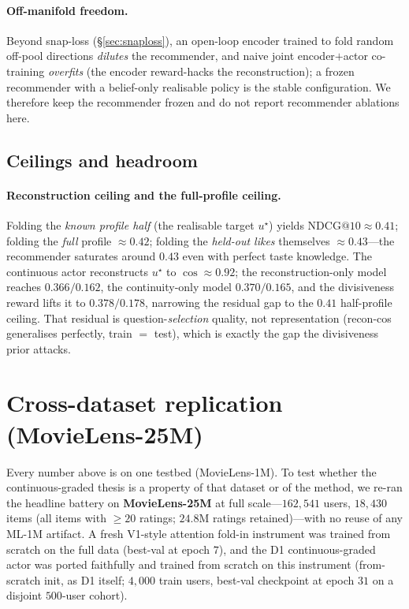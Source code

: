 \documentclass[11pt]{article}
\newcommand{\ustar}{u^{\star}}
\begin{document}
\paragraph{Off-manifold freedom.} Beyond snap-loss (\S\ref{sec:snaploss}), an open-loop encoder trained to fold random
off-pool directions \emph{dilutes} the recommender, and naive joint encoder$+$actor co-training \emph{overfits} (the
encoder reward-hacks the reconstruction); a frozen recommender with a belief-only realisable policy is the stable
configuration. We therefore keep the recommender frozen and do not report recommender ablations here.

\subsection{Ceilings and headroom}\label{sec:ceiling}
\paragraph{Reconstruction ceiling and the full-profile ceiling.} Folding the \emph{known profile half} (the realisable
target $\ustar$) yields $\mathrm{NDCG@10}\approx0.41$; folding the \emph{full} profile $\approx0.42$; folding the
\emph{held-out likes} themselves $\approx0.43$---the recommender saturates around $0.43$ even with perfect taste
knowledge. The continuous actor reconstructs $\ustar$ to $\cos\approx0.92$; the reconstruction-only model reaches
$0.366/0.162$, the continuity-only model $0.370/0.165$, and the divisiveness reward lifts it to $0.378/0.178$, narrowing the residual gap to the $0.41$
half-profile ceiling. That residual is question-\emph{selection} quality, not representation (recon-cos generalises
perfectly, train $=$ test), which is exactly the gap the divisiveness prior attacks.

\section{Cross-dataset replication (MovieLens-25M)}\label{sec:ml25m}
Every number above is on one testbed (MovieLens-1M). To test whether the continuous-graded thesis is a property of
that dataset or of the method, we re-ran the headline battery on \textbf{MovieLens-25M} at full scale---$162{,}541$
users, $18{,}430$ items (all items with $\ge20$ ratings; $24.8$M ratings retained)---with no reuse of any ML-1M
artifact. A fresh V1-style attention fold-in instrument was trained from scratch on the full data (best-val at epoch
$7$), and the D1 continuous-graded actor was ported faithfully and trained from scratch on this instrument (from-scratch
init, as D1 itself; $4{,}000$ train users, best-val checkpoint at epoch $31$ on a disjoint $500$-user cohort).
\end{document}
